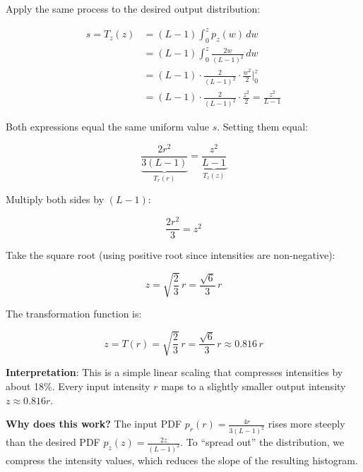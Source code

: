 \documentclass[12pt]{article}
\begin{document}
\begin{stepbox}

Apply the same process to the desired output distribution:

\begin{align*}
s = T_z(z) &= (L-1) \int_0^z p_z(w)\,dw \\[0.5em]
&= (L-1) \int_0^z \frac{2w}{(L-1)^2}\,dw \\[0.5em]
&= (L-1) \cdot \frac{2}{(L-1)^2} \cdot \frac{w^2}{2} \Big|_0^z \\[0.5em]
&= (L-1) \cdot \frac{2}{(L-1)^2} \cdot \frac{z^2}{2} = \boxed{\frac{z^2}{L-1}}
\end{align*}

\end{stepbox}

\begin{stepbox}

Both expressions equal the same uniform value $s$. Setting them equal:

\[
\underbrace{\frac{2r^2}{3(L-1)}}_{T_r(r)} = \underbrace{\frac{z^2}{L-1}}_{T_z(z)}
\]

Multiply both sides by $(L-1)$:

\[
\frac{2r^2}{3} = z^2
\]

Take the square root (using positive root since intensities are non-negative):

\[
z = \sqrt{\frac{2}{3}}\, r = \frac{\sqrt{6}}{3}\, r
\]

\end{stepbox}

\begin{resultsbox}

The transformation function is:

\[
\boxed{z = T(r) = \sqrt{\frac{2}{3}}\, r = \frac{\sqrt{6}}{3}\, r \approx 0.816\, r}
\]

\vspace{0.2cm}

\textbf{Interpretation}: This is a simple linear scaling that compresses intensities by about 18\%. Every input intensity $r$ maps to a slightly smaller output intensity $z \approx 0.816r$.

\vspace{0.2cm}

\textbf{Why does this work?} The input PDF $p_r(r) = \frac{4r}{3(L-1)^2}$ rises more steeply than the desired PDF $p_z(z) = \frac{2z}{(L-1)^2}$. To ``spread out'' the distribution, we compress the intensity values, which reduces the slope of the resulting histogram.

\end{resultsbox}
\end{document}
